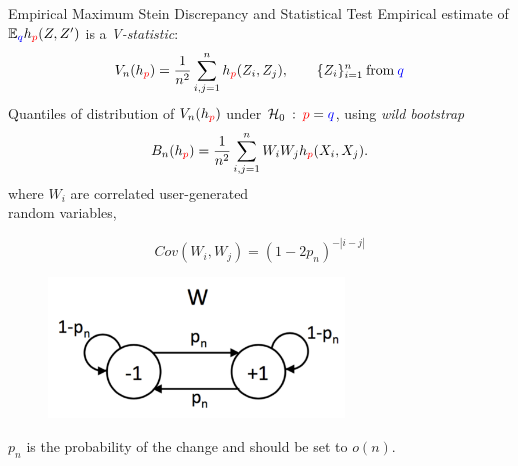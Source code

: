 \begin{frame}
\begin{columns}
\begin{column}{.33\linewidth}
\vspace{-0.75cm}
\begin{block}{Empirical Maximum Stein Discrepancy and Statistical Test}
Empirical estimate  of $\mathbb{E}_{\color{blue} q} h_{\color{red} p}(Z,Z')$ is
a {\em V-statistic}: 
\[
 V_n(h_{\color{red} p}) = \frac {1} {n^2} \sum_{i,j=1}^n h_{\color{red} p}(Z_i,Z_j),
 \qquad
 \{ Z_i \}_{i=1}^{n} \:\mathrm{from}\: {\color{blue} q}
\]
Quantiles of distribution of $ V_n(h_{\color{red} p})$ under $\mathcal{H}_0\::\:{\color{red} p}={\color{blue}q}$,  using {\em wild bootstrap}
\[
 B_n(h_{\color{red} p}) = \frac {1} {n^2} \sum_{i,j=1}^n W_i W_j h_{\color{red} p}(X_i,X_j).
\]
  where $W_i$ are correlated user-generated\\ random variables,
  \vspace{-1.3cm}
\begin{center}
  \begin{minipage}{.49\linewidth}
       $$
  Cov(W_i,W_j) = (1-2p_n)^{-|i-j|}
  $$
\end{minipage}
\begin{minipage}{.49\linewidth}
 \begin{figure}
            \vspace{-0.5cm}
           \includegraphics[width=0.7\textwidth, angle =0 ]{../../presentation/img/W_graphicalModel.pdf} 
        \end{figure}
\end{minipage}
\end{center}
  $p_n$ is  the probability of the change  and should be set to $o(n)$.

\begin{center}


\end{center}
\end{block}
\end{column}
\end{columns}
\end{frame}
